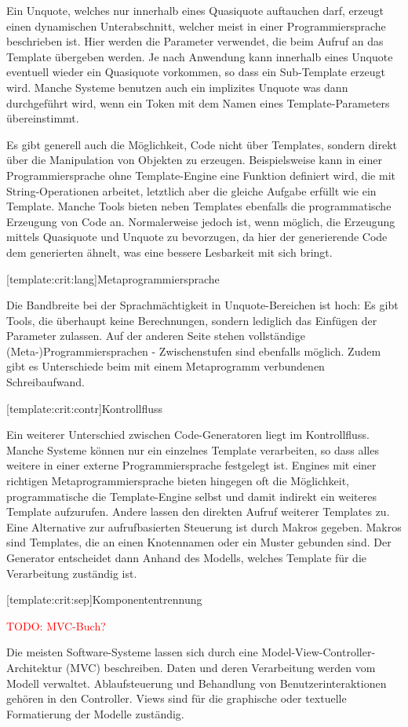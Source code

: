 \documentclass[11pt, a4paper, bibgerm]{book}
\newcommand{\todo}[1]{
  \textcolor{red}{TODO: #1}
}
\newcommand\lsubsection{}
\begin{document}
Ein Unquote, welches nur innerhalb eines Quasiquote auftauchen darf, erzeugt
einen dynamischen Unterabschnitt, welcher meist in einer
Programmiersprache beschrieben ist. Hier werden die Parameter verwendet,
die beim Aufruf an das Template übergeben werden. Je nach Anwendung kann
innerhalb eines Unquote eventuell wieder ein Quasiquote vorkommen, so dass
ein Sub-Template erzeugt wird. Manche Systeme benutzen auch ein
implizites Unquote was dann durchgeführt wird, wenn ein Token mit dem
Namen eines Template-Parameters übereinstimmt.

Es gibt generell auch die Möglichkeit, Code nicht über Templates,
sondern direkt über die Manipulation von Objekten zu
erzeugen. Beispielsweise kann in einer Programmiersprache ohne
Template-Engine eine Funktion definiert wird, die mit String-Operationen
arbeitet, letztlich aber die gleiche Aufgabe erfüllt wie ein
Template. Manche Tools bieten neben Templates ebenfalls die
programmatische Erzeugung von Code an. Normalerweise jedoch ist, wenn
möglich, die Erzeugung mittels Quasiquote und Unquote zu bevorzugen, da hier
der generierende Code dem generierten ähnelt, was eine bessere
Lesbarkeit mit sich bringt.

\lsubsection[template:crit:lang]{Metaprogrammiersprache}

Die Bandbreite bei der Sprachmächtigkeit in Unquote-Bereichen ist hoch:
Es gibt Tools, die überhaupt keine Berechnungen, sondern lediglich das
Einfügen der Parameter zulassen. Auf der anderen Seite stehen
vollständige (Meta-)Programmiersprachen - Zwischenstufen sind ebenfalls
möglich. Zudem gibt es Unterschiede beim mit einem Metaprogramm
verbundenen Schreibaufwand.

\lsubsection[template:crit:contr]{Kontrollfluss}

Ein weiterer Unterschied zwischen Code-Generatoren liegt im
Kontrollfluss. Manche Systeme können nur ein einzelnes Template
verarbeiten, so dass alles weitere in einer externe Programmiersprache
festgelegt ist. Engines mit einer richtigen Metaprogrammiersprache
bieten hingegen oft die Möglichkeit, programmatische die Template-Engine
selbst und damit indirekt ein weiteres Template aufzurufen. Andere
lassen den direkten Aufruf weiterer Templates zu. Eine Alternative zur
aufrufbasierten Steuerung ist durch Makros gegeben. Makros sind
Templates, die an einen Knotennamen oder ein Muster gebunden sind. Der
Generator entscheidet dann Anhand des Modells, welches Template für die
Verarbeitung zuständig ist.

\lsubsection[template:crit:sep]{Komponententrennung}
\todo{MVC-Buch?}
Die meisten Software-Systeme lassen sich durch eine
Model-View-Controller-Architektur (MVC) beschreiben. Daten und deren
Verarbeitung werden vom Modell verwaltet. Ablaufsteuerung und Behandlung
von Benutzerinteraktionen gehören in den Controller. Views sind für die
graphische oder textuelle Formatierung der Modelle zuständig.
\end{document}
